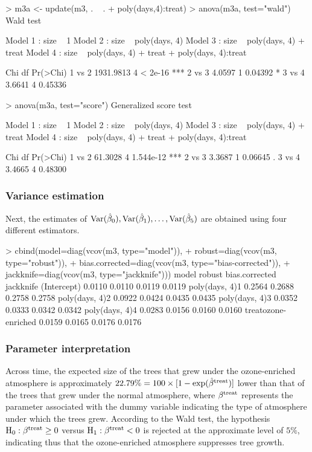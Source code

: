 \begin{example}
> m3a <- update(m3, . ~ . + poly(days,4):treat)
> anova(m3a, test="wald")
Wald test 

Model 1 :  size ~ 1 
Model 2 :  size ~ poly(days, 4) 
Model 3 :  size ~ poly(days, 4) + treat 
Model 4 :  size ~ poly(days, 4) + treat + poly(days, 4):treat 

           Chi    df   Pr(>Chi)    
1 vs 2 1931.9813   4    < 2e-16 ***
2 vs 3    4.0597   1    0.04392 *  
3 vs 4    3.6641   4    0.45336 

> anova(m3a, test="score")
Generalized score test 

Model 1 :  size ~ 1 
Model 2 :  size ~ poly(days, 4) 
Model 3 :  size ~ poly(days, 4) + treat 
Model 4 :  size ~ poly(days, 4) + treat + poly(days, 4):treat 

         Chi    df   Pr(>Chi)    
1 vs 2 61.3028   4  1.544e-12 ***
2 vs 3  3.3687   1    0.06645 .  
3 vs 4  3.4665   4    0.48300   
\end{example}

\subsubsection{Variance estimation}
Next, the estimates of ${\rm Var}(\hat{\beta}_0),{\rm Var}(\hat{\beta}_1),\ldots,{\rm Var}(\hat{\beta}_5)$ are obtained using four different estimators.
\begin{example}
> cbind(model=diag(vcov(m3, type="model")), 
+       robust=diag(vcov(m3, type="robust")), 
+       bias.corrected=diag(vcov(m3, type="bias-corrected")),
+       jackknife=diag(vcov(m3, type="jackknife")))
                     model robust bias.corrected jackknife
(Intercept)         0.0110 0.0110         0.0119    0.0119
poly(days, 4)1      0.2564 0.2688         0.2758    0.2758
poly(days, 4)2      0.0922 0.0424         0.0435    0.0435
poly(days, 4)3      0.0352 0.0333         0.0342    0.0342
poly(days, 4)4      0.0283 0.0156         0.0160    0.0160
treatozone-enriched 0.0159 0.0165         0.0176    0.0176
\end{example}

\subsubsection{Parameter interpretation}
Across time, the expected size of the trees that grew under the ozone-enriched atmosphere is approximately $22.79\% = 100\times[1-\exp(\hat{\beta}^{\rm treat})]$ lower than that of the trees that grew under the normal atmosphere, where $\beta^{\rm treat}$ represents the parameter associated with the dummy variable indicating the type of atmosphere under which the trees grew. According to the Wald test, the hypothesis ${\rm H}_0: {\beta}^{\rm treat} \geq 0$ versus ${\rm H}_1: {\beta}^{\rm treat} < 0$ is rejected at the approximate level of $5\%$, indicating thus that the ozone-enriched atmosphere suppresses tree growth. 

